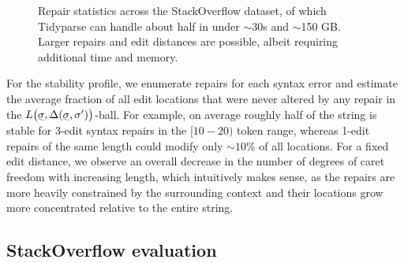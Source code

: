 \documentclass[sigplan,review,acmsmall,nonacm,anonymous]{acmart}\settopmatter{printfolios=false,printccs=false,printacmref=false}
\begin{document}
\begin{figure}[h!]
    \caption{Repair statistics across the StackOverflow dataset, of which Tidyparse can handle about half in under $\sim$30s and $\sim$150 GB. Larger repairs and edit distances are possible, albeit requiring additional time and memory.}\label{fig:patch_stats}
  \end{figure}

  For the stability profile, we enumerate repairs for each syntax error and estimate the average fraction of all edit locations that were never altered by any repair in the $L\big(\err\sigma, \Delta(\err\sigma, \sigma')\big)$-ball. For example, on average roughly half of the string is stable for 3-edit syntax repairs in the $[10-20)$ token range, whereas 1-edit repairs of the same length could modify only $\sim 10\%$ of all locations. For a fixed edit distance, we observe an overall decrease in the number of degrees of caret freedom with increasing length, which intuitively makes sense, as the repairs are more heavily constrained by the surrounding context and their locations grow more concentrated relative to the entire string.



  \clearpage\subsection{StackOverflow evaluation}\label{sec:rq2}
\end{document}
